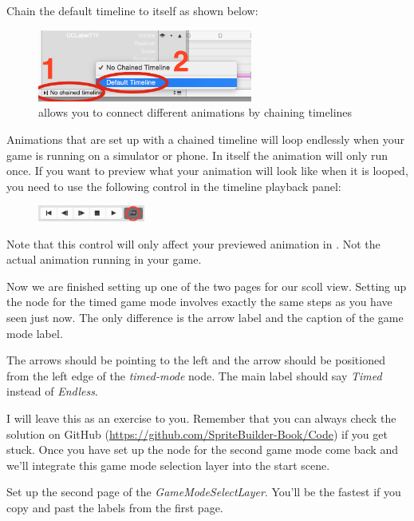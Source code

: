 \begin{leftbar}
Chain the default timeline to itself as shown below:
\begin{figure}[H]
\centering
\includegraphics[width=200pt]{images/Chapter7/chain_timeline_2.png}
\caption{\SB{} allows you to connect different animations by chaining
timelines}
\end{figure}
\end{leftbar}

\begin{details}
Animations that are set up with a chained timeline will loop endlessly when your
game is running on a simulator or phone. In \SB{} itself the animation will only
run once. If you want to preview what your animation will look like when it is
looped, you need to use the following control in the timeline playback panel:
\begin{figure}[H]
\centering
\includegraphics[width=100pt]{images/Chapter7/loop_timeline.png}
\end{figure}
Note that this control will only affect your previewed animation in \SB{}. Not
the actual animation running in your game.
\end{details}

Now we are finished setting up one of the two pages for our scoll view. Setting
up the node for the timed game mode involves exactly the same steps as you have seen just
now. The only difference is the arrow label and the caption of the game mode
label.

The arrows should be pointing to the left and the arrow should be positioned from the left edge of the
\textit{timed-mode} node. The main label should say \textit{Timed}
instead of \textit{Endless}. 

I will leave this as an exercise to you. Remember that you can always check the
solution on GitHub (\url{https://github.com/SpriteBuilder-Book/Code}) if you get
stuck.
Once you have set up the node for the second game mode come back and we'll
integrate this game mode selection layer into the start scene.

\begin{leftbar}
Set up the second page of the \textit{GameModeSelectLayer}. You'll be the
fastest if you copy and past the labels from the first page.
\end{leftbar}

